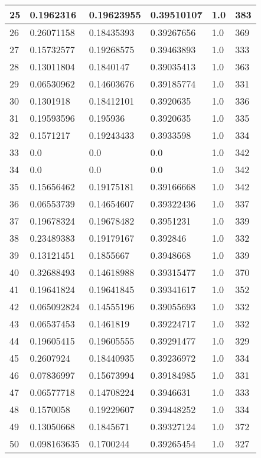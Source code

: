 \begin{longtable}{|l|l|l|l|l|l|}
25 & 0.1962316 & 0.19623955 & 0.39510107 & 1.0 & 383 \\ \hline 
26 & 0.26071158 & 0.18435393 & 0.39267656 & 1.0 & 369 \\ \hline 
27 & 0.15732577 & 0.19268575 & 0.39463893 & 1.0 & 333 \\ \hline 
28 & 0.13011804 & 0.1840147 & 0.39035413 & 1.0 & 363 \\ \hline 
29 & 0.06530962 & 0.14603676 & 0.39185774 & 1.0 & 331 \\ \hline 
30 & 0.1301918 & 0.18412101 & 0.3920635 & 1.0 & 336 \\ \hline 
31 & 0.19593596 & 0.195936 & 0.3920635 & 1.0 & 335 \\ \hline 
32 & 0.1571217 & 0.19243433 & 0.3933598 & 1.0 & 334 \\ \hline 
33 & 0.0 & 0.0 & 0.0 & 1.0 & 342 \\ \hline 
34 & 0.0 & 0.0 & 0.0 & 1.0 & 342 \\ \hline 
35 & 0.15656462 & 0.19175181 & 0.39166668 & 1.0 & 342 \\ \hline 
36 & 0.06553739 & 0.14654607 & 0.39322436 & 1.0 & 337 \\ \hline 
37 & 0.19678324 & 0.19678482 & 0.3951231 & 1.0 & 339 \\ \hline 
38 & 0.23489383 & 0.19179167 & 0.392846 & 1.0 & 332 \\ \hline 
39 & 0.13121451 & 0.1855667 & 0.3948668 & 1.0 & 339 \\ \hline 
40 & 0.32688493 & 0.14618988 & 0.39315477 & 1.0 & 370 \\ \hline 
41 & 0.19641824 & 0.19641845 & 0.39341617 & 1.0 & 352 \\ \hline 
42 & 0.065092824 & 0.14555196 & 0.39055693 & 1.0 & 332 \\ \hline 
43 & 0.06537453 & 0.1461819 & 0.39224717 & 1.0 & 332 \\ \hline 
44 & 0.19605415 & 0.19605555 & 0.39291477 & 1.0 & 329 \\ \hline 
45 & 0.2607924 & 0.18440935 & 0.39236972 & 1.0 & 334 \\ \hline 
46 & 0.07836997 & 0.15673994 & 0.39184985 & 1.0 & 331 \\ \hline 
47 & 0.06577718 & 0.14708224 & 0.3946631 & 1.0 & 333 \\ \hline 
48 & 0.1570058 & 0.19229607 & 0.39448252 & 1.0 & 334 \\ \hline 
49 & 0.13050668 & 0.1845671 & 0.39327124 & 1.0 & 372 \\ \hline 
50 & 0.098163635 & 0.1700244 & 0.39265454 & 1.0 & 327 \\ \hline 
\end{longtable}
